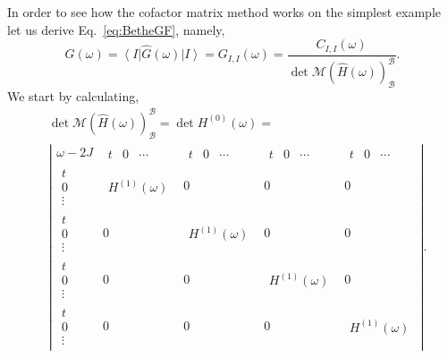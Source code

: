 \documentclass{article}
\newcommand{\ket}[1]{\left\vert #1 \right\rangle}
\newcommand{\bra}[1]{\left\langle #1 \right\vert}
\begin{document}
In order to see how the cofactor matrix method works on the simplest example let us derive Eq.~\eqref{eq:BetheGF}, namely,
\begin{equation}
    G(\omega) = \bra{I}\hat{G}(\omega)\ket{I} = G_{I,I}(\omega) = \frac{C_{I,I}(\omega)}{\det \mathcal{M}(\hat{H}(\omega))_\mathcal{B}^\mathcal{B}}.
\end{equation}
We start by calculating,
\begin{equation}
\begin{split}
    &\det \mathcal{M}(\hat{H}(\omega))_\mathcal{B}^\mathcal{B} =
    \det H^{(0)}(\omega) = \\ 
    &\left\vert
    \begin{array}{c|c|c|c|c}
        \omega - 2J & 
            \begin{array}{ccc} t & 0 & \cdots \end{array} &
            \begin{array}{ccc} t & 0 & \cdots \end{array} &
            \begin{array}{ccc} t & 0 & \cdots \end{array} &
            \begin{array}{ccc} t & 0 & \cdots \end{array} \\
        \hline
        \begin{array}{c} t \\ 0 \\ \vdots \end{array} & 
            \begin{array}{c} H^{(1)}(\omega) \end{array} & 0 & 0 & 0 \\
        \hline
        \begin{array}{c} t \\ 0 \\ \vdots \end{array} & 
            0 & \begin{array}{c} H^{(1)}(\omega) \end{array} & 0 & 0 \\
        \hline
        \begin{array}{c} t \\ 0 \\ \vdots \end{array} & 
            0 & 0 &\begin{array}{c} H^{(1)}(\omega) \end{array} & 0 \\
        \hline
        \begin{array}{c} t \\ 0 \\ \vdots \end{array} & 
            0 & 0 & 0 & \begin{array}{c} H^{(1)}(\omega) \end{array}
    \end{array}
    \right\vert.
\end{split}
\end{equation}
\end{document}
